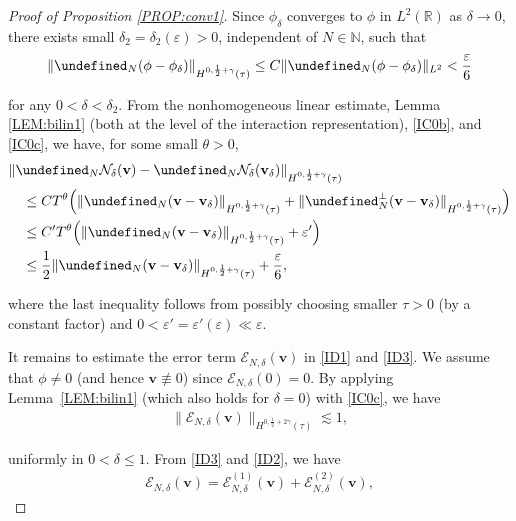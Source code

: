 \documentclass[letterpaper, 11pt,  reqno]{amsart}
\newcommand{\1}{\hspace{0.5mm}\textup{I}\hspace{0.5mm}}
\newcommand{\noi}{\noindent}
\newcommand{\R}{\mathbb{R}}
\let\P= \undefined
\newcommand{\P}{\mathbf{P}}
\newcommand{\EE}{\mathcal{E}}
\newcommand{\dl}{\delta}
\newcommand{\eps}{\varepsilon}
\newcommand{\g}{\gamma}
\newcommand{\ta}{\theta}
\newcommand{\les}{\lesssim}
\newcommand{\N}{\mathbb{N}}
\newcommand{\NN}{\mathcal{N}}
\newcommand{\vv}{\mathbf{v}}
\numberwithin{equation}{section}
\numberwithin{theorem}{section}
\begin{document}
\begin{proof}[Proof of Proposition \ref{PROP:conv1}]
Since $\phi_\dl$ converges to $\phi$ in $L^2(\R)$
as $\dl \to 0$, 
there exists small $\dl_2 = \dl_2(\eps) > 0$, 
independent of $N \in \N$,  such that 
\begin{align}
\|\P_N (\phi - \phi_\dl)\|_{H^{0, \frac 12 + \g}(\tau)}
\le C\|\P_N (\phi - \phi_\dl)\|_{L^2}
< \frac \eps 6
\label{ID4}
\end{align}


\noi
for any $0 < \dl < \dl_2$.
From the nonhomogeneous linear estimate, Lemma \ref{LEM:bilin1} 
(both at the level of the interaction representation), 
\eqref{IC0b}, and \eqref{IC0c}, we have, 
for some small $\ta > 0$, 
\begin{align}
\begin{split}
& \|\P_N \NN_\dl(\vv)
- 
\P_N \NN_\dl(\vv_\dl)\|_{H^{0, \frac 12 + \g}(\tau)}\\
& \quad \le CT^\ta 
\Big(\|\P_N (\vv - \vv_\dl) \|_{H^{0, \frac 12 + \g}(\tau)}
+ \|\P_N^\perp (\vv - \vv_\dl) \|_{H^{0, \frac 12 + \g}(\tau)}\Big)\\
& \quad \le C'T^\ta
\Big(\|\P_N (\vv - \vv_\dl) \|_{H^{0, \frac 12 + \g}(\tau)}
+ \eps'\Big)\\
& \quad \le \frac 12 
\|\P_N (\vv - \vv_\dl) \|_{H^{0, \frac 12 + \g}(\tau)}
+ \frac \eps 6, 
\end{split}
\label{ID5}
\end{align}

\noi
where the last inequality follows
from possibly choosing smaller $\tau > 0$
(by a constant factor) and $0 < \eps' = \eps'(\eps) \ll \eps$.


It remains to estimate the error term $\EE_{N, \dl}(\vv)$
in \eqref{ID1} and \eqref{ID3}.
We assume that $\phi\ne 0$ (and hence $\vv \not \equiv 0$)
since $\EE_{N, \dl}(0) = 0$.
By applying Lemma~\ref{LEM:bilin1}
(which also holds for $\dl = 0$)
with \eqref{IC0c}, we have 
\begin{align}
\|\EE_{N, \dl}(\vv)\|_{H^{0, \frac 12 + 2\g}(\tau)}
\les 1, 
\label{ID6}
\end{align}

\noi
uniformly in $0 < \dl \le 1$.
From \eqref{ID3} and \eqref{ID2}, 
we have 
\begin{align}
\EE_{N, \dl}(\vv) = \EE_{N, \dl}^{(1)}(\vv) + \EE_{N, \dl}^{(2)}(\vv), 
\label{ID7}
\end{align}


\end{proof}
\end{document}

